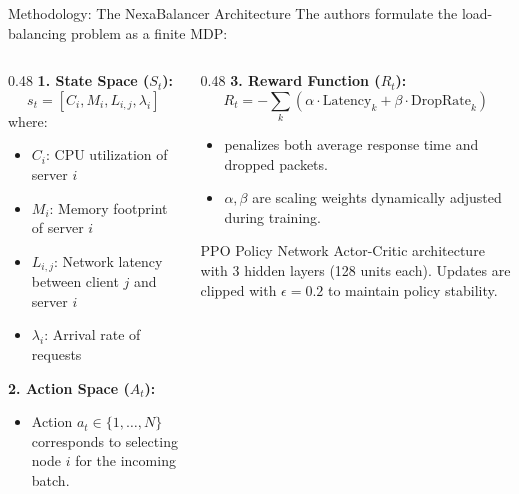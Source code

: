 \begin{frame}{Methodology: The NexaBalancer Architecture}
  The authors formulate the load-balancing problem as a finite MDP:
  
  \vspace{0.2cm}
  \begin{columns}[T]
    \begin{column}{0.48\textwidth}
      \textbf{1. State Space ($S_t$):}
      \begin{equation*}
        s_t = [C_i, M_i, L_{i,j}, \lambda_i]
      \end{equation*}
      where:
      \begin{itemize}
        \item $C_i$: CPU utilization of server $i$
        \item $M_i$: Memory footprint of server $i$
        \item $L_{i,j}$: Network latency between client $j$ and server $i$
        \item $\lambda_i$: Arrival rate of requests
      \end{itemize}
      
      \textbf{2. Action Space ($A_t$):}
      \begin{itemize}
        \item Action $a_t \in \{1, \dots, N\}$ corresponds to selecting node $i$ for the incoming batch.
      \end{itemize}
    \end{column}
    
    \begin{column}{0.48\textwidth}
      \textbf{3. Reward Function ($R_t$):}
      \begin{equation*}
        R_t = - \sum_{k} \left( \alpha \cdot \text{Latency}_k + \beta \cdot \text{DropRate}_k \right)
      \end{equation*}
      \begin{itemize}
        \item penalizes both average response time and dropped packets.
        \item $\alpha, \beta$ are scaling weights dynamically adjusted during training.
      \end{itemize}
      
      \begin{highlightbox}{PPO Policy Network}
        Actor-Critic architecture with 3 hidden layers (128 units each). Updates are clipped with $\epsilon = 0.2$ to maintain policy stability.
      \end{highlightbox}
    \end{column}
  \end{columns}
\end{frame}

